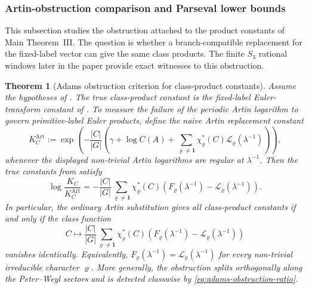 \documentclass[11pt,a4paper]{amsart}
\theoremstyle{plain}
\newtheorem{theorem}{Theorem}[section]
\theoremstyle{definition}
\theoremstyle{remark}
\begin{document}
\subsubsection{Artin-obstruction comparison and Parseval lower bounds}

This subsection studies the obstruction attached to the product constants of
Main Theorem~III.  The question is whether a branch-compatible replacement for
the fixed-label vector can give the same class products.  The finite \(S_3\)
rational windows later in the paper provide exact witnesses to this
obstruction.

\begin{theorem}[Adams obstruction criterion for class-product constants]
  \label{thm:adams-obstruction-class-product}
  Assume the hypotheses of . The true
  class-product constant is the fixed-label Euler-transform constant of
  . To measure the failure of the
  periodic Artin logarithm to govern primitive-label Euler products,
  define the naive Artin replacement constant
  \begin{equation}\label{eq:naive-artin-class-product-constant}
    K_C^{\mathrm{Art}}
    :=
    \exp\!\left(
      -\frac{|C|}{|G|}
      \left(
        \gamma+\log C(A)
        +\sum_{\varrho\neq\mathbf1}
          \chi_\varrho^\ast(C)\mathcal L_\varrho(\lambda^{-1})
      \right)
    \right),
  \end{equation}
  whenever the displayed non-trivial Artin logarithms are regular at
  \(\lambda^{-1}\). Then the true constants from
   satisfy
  \begin{equation}\label{eq:adams-obstruction-ratio}
    \log\frac{K_C}{K_C^{\mathrm{Art}}}
    =
    -\frac{|C|}{|G|}
      \sum_{\varrho\neq\mathbf1}
        \chi_\varrho^\ast(C)
        \left(F_\varrho(\lambda^{-1})-
        \mathcal L_\varrho(\lambda^{-1})\right).
  \end{equation}
  In particular, the ordinary Artin substitution gives all class-product
  constants if and only if the class function
  \begin{equation}\label{eq:adams-obstruction-class-function}
    C\longmapsto
    \frac{|C|}{|G|}
      \sum_{\varrho\neq\mathbf1}
        \chi_\varrho^\ast(C)
        \left(F_\varrho(\lambda^{-1})-
        \mathcal L_\varrho(\lambda^{-1})\right)
  \end{equation}
  vanishes identically. Equivalently,
  \(F_\varrho(\lambda^{-1})=\mathcal L_\varrho(\lambda^{-1})\) for every
  non-trivial irreducible character \(\varrho\). More generally, the
  obstruction splits orthogonally along the Peter--Weyl sectors and is
  detected classwise by \eqref{eq:adams-obstruction-ratio}.
\end{theorem}
\end{document}
